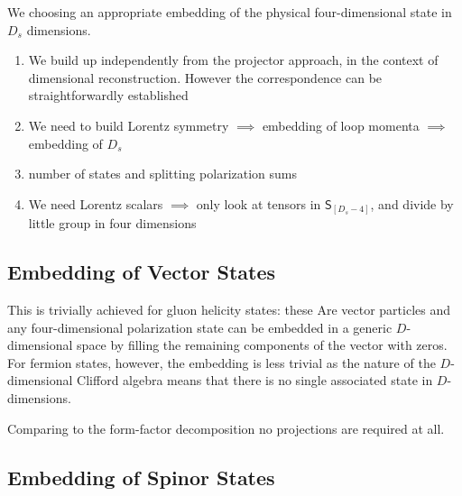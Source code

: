 We 
choosing an appropriate embedding of the physical four-dimensional state in $D_s$ dimensions.


\begin{enumerate}
  \item We build up independently from the projector approach, in the context of dimensional reconstruction. 
    However the correspondence can be straightforwardly established
  \item We need to build Lorentz symmetry $\implies $ embedding of loop momenta $\implies $ embedding of $D_s$
  \item number of states and splitting polarization sums
  \item We need Lorentz scalars $\implies $ only look at tensors in $\mathsf{S}_{[D_s-4]}$,
    and divide by little group in four dimensions
\end{enumerate}


\subsection{Embedding of Vector States}
\label{sec:embedding_vectors}

This is trivially achieved for gluon helicity states: these
Are vector particles and any four-dimensional polarization state
can be embedded in a generic $D$-dimensional space by filling 
the remaining components of the vector with zeros. 
For fermion states, however, the embedding is less trivial as 
the nature of the $D$-dimensional Clifford algebra means that
there is no single associated state in $D$-dimensions.  


Comparing to the form-factor decomposition no projections are required at all.

\subsection{Embedding of Spinor States}
\label{sec:Clifford}


